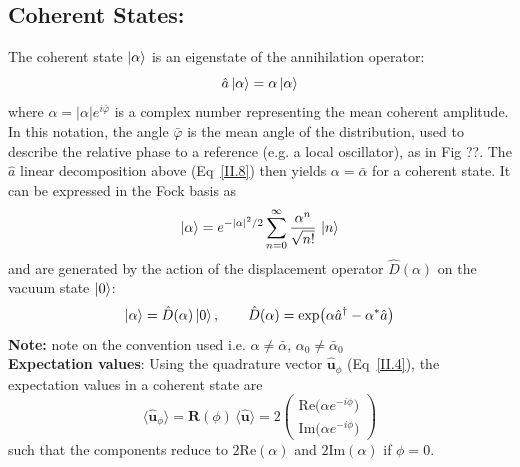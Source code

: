\subsection*{Coherent States:}
The coherent state $\ket{\alpha}$ is an eigenstate of the annihilation operator:
\begin{equation}
\hat{a}\ket{\alpha} = \alpha \ket{\alpha}
\label{II.14}
\end{equation}
where $\alpha = |\alpha| e^{i\bar{\varphi}}$ is a complex number representing the mean coherent amplitude. In this notation, the angle $\bar{\varphi}$ is the mean angle of the distribution, used to describe the relative phase to a reference (e.g. a local oscillator), as in Fig ??. The $\hat{a}$ linear decomposition above (Eq~\eqref{II.8}) then yields $\alpha = \bar{\alpha}$ for a coherent state. It can be expressed in the Fock basis as
\begin{equation}
\ket{\alpha} = e^{-|\alpha|^2/2} \sum_{n=0}^\infty \frac{\alpha^n}{\sqrt{n!}}\,\ket{n}
\label{II.15}
\end{equation}
and are generated by the action of the displacement operator $\hat{D}(\alpha)$ on the vacuum state $\ket{0}$:
\begin{equation}
\ket{\alpha} = \hat{D}(\alpha)\ket{0},\qquad \hat{D}(\alpha) = \exp\!\left(\alpha \hat{a}^\dagger - \alpha^* \hat{a}\right)
\label{II.16}
\end{equation}
\noindent \textbf{Note:} \color{red} note on the convention used i.e. $\alpha \neq \bar{\alpha}$, $\alpha_0 \neq \bar{\alpha}_0$ \color{black} \\ 

\noindent \textbf{Expectation values}: Using the quadrature vector $\mathbf{\hat{u}}_\phi$ (Eq~\ref{II.4}), the expectation values in a coherent state are
\begin{equation}
\langle \mathbf{\hat{\mathbf u}} _\phi\rangle
= \mathbf R(\phi)\,\langle \mathbf{\hat{\mathbf u}}\rangle
=
2\begin{pmatrix}
\mathrm{Re}\big(\alpha e^{-i\phi}\big) \\[2pt]
\mathrm{Im}\big(\alpha e^{-i\phi}\big)
\end{pmatrix}
\end{equation}
such that the components reduce to $2\mathrm{Re} (\alpha)$ and  $2\mathrm{Im} (\alpha)$ if $\phi=0$. \\

